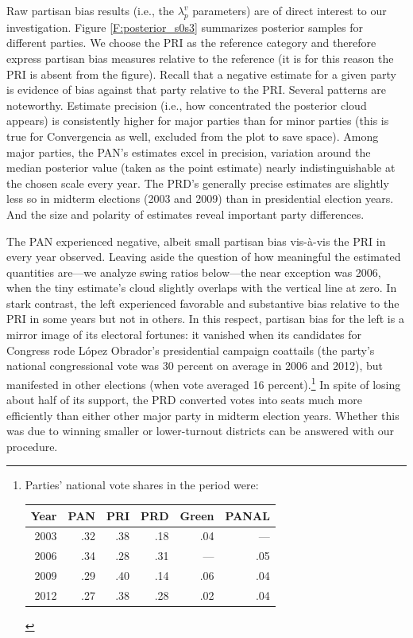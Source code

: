 \documentclass[letter,12pt]{article}
\begin{document}

Raw partisan bias results (i.e., the $\lambda_p^v$ parameters) are of direct interest to our investigation. Figure \ref{F:posterior_s0s3} summarizes posterior samples for different parties. We choose the PRI as the reference category and therefore express partisan bias measures relative to the reference (it is for this reason the PRI is absent from the figure). Recall that a negative estimate for a given party is evidence of bias against that party relative to the PRI. Several patterns are noteworthy. Estimate precision (i.e., how concentrated the posterior cloud appears) is consistently higher for major parties than for minor parties (this is true for Convergencia as well, excluded from the plot to save space). Among major parties, the PAN's estimates excel in precision, variation around the median posterior value (taken as the point estimate) nearly indistinguishable at the chosen scale every year. The PRD's generally precise estimates are slightly less so in midterm elections (2003 and 2009) than in presidential election years. And the size and polarity of estimates reveal important party differences. 

The PAN experienced negative, albeit small partisan bias vis-\`a-vis the PRI in every year observed. Leaving aside the question of how meaningful the estimated quantities are---we analyze swing ratios below---the near exception was 2006, when the tiny estimate's cloud slightly overlaps with the vertical line at zero. In stark contrast, the left experienced favorable and substantive bias relative to the PRI in some years but not in others. In this respect, partisan bias for the left is a mirror image of its electoral fortunes: it vanished when its candidates for Congress rode L\'opez Obrador's presidential campaign coattails (the party's national congressional vote was 30 percent on average in 2006 and 2012), but manifested in other elections (when vote averaged 16 percent).\footnote{Parties' national vote shares in the period were: \begin{tabular}{rrrrrr} Year & PAN & PRI & PRD & Green & PANAL \\ \hline 2003 & .32 & .38 & .18 & .04 & --- \\ 2006 & .34 & .28 & .31 & --- & .05 \\ 2009 & .29 & .40 & .14 & .06 & .04 \\ 2012 & .27 & .38 & .28 & .02 & .04 \\ \end{tabular}} In spite of losing about half of its support, the PRD converted votes into seats much more efficiently than either other major party in midterm election years. Whether this was due to winning smaller or lower-turnout districts can be answered with our procedure.
\end{document}
